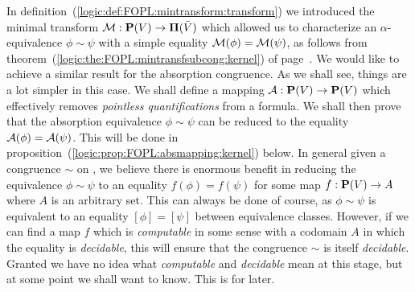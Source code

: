 In definition~(\ref{logic:def:FOPL:mintransform:transform}) we
introduced the minimal transform ${\cal M}:\mbox{${\bf P}(V)$}\to\mbox{${\bf\Pi}(\bar{V})$}$ which allowed
us to characterize an $\alpha$-equivalence $\phi\sim\psi$ with a
simple equality ${\cal M}(\phi)={\cal M}(\psi)$, as follows from
theorem~(\ref{logic:the:FOPL:mintransfsubcong:kernel}) of
page~\pageref{logic:the:FOPL:mintransfsubcong:kernel}. We would like
to achieve a similar result for the absorption congruence. As we
shall see, things are a lot simpler in this case. We shall define a
mapping ${\cal A}:\mbox{${\bf P}(V)$}\to\mbox{${\bf P}(V)$}$ which effectively removes {\em
pointless quantifications} from a formula. We shall then prove that
the absorption equivalence $\phi\sim\psi$ can be reduced to the
equality ${\cal A}(\phi)={\cal A}(\psi)$. This will be done in
proposition~(\ref{logic:prop:FOPL:absmapping:kernel}) below. In
general given a congruence $\sim$ on \pv, we believe there is
enormous benefit in reducing the equivalence $\phi\sim\psi$ to an
equality $f(\phi)=f(\psi)$ for some map $f:\mbox{${\bf P}(V)$}\to A$ where $A$ is an
arbitrary set. This can always be done of course, as $\phi\sim\psi$
is equivalent to an equality $[\phi]=[\psi]$ between equivalence
classes. However, if we can find a map $f$ which is {\em computable}
in some sense with a codomain $A$ in which the equality is {\em
decidable}, this will ensure that the congruence $\sim$ is itself
{\em decidable}. Granted we have no idea what {\em computable} and
{\em decidable} mean at this stage, but at some point we shall want
to know. This is for later.

